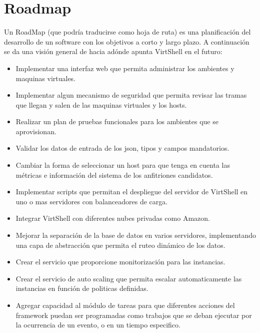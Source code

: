 
\chapter{Roadmap}
\label{roadmap}

Un RoadMap (que podría traducirse como hoja de ruta) es una planificación del desarrollo de un software con los objetivos a corto y largo plazo. A continuación se da una visión general de hacia adónde apunta VirtShell en el futuro:

\begin{itemize}
\item Implementar una interfaz web que permita administrar los ambientes y maquinas virtuales.
\item Implementar algun mecanismo de seguridad que permita revisar las tramas que llegan y salen de las maquinas virtuales y los hosts.
\item Realizar un plan de pruebas funcionales para los ambientes que se aprovisionan.
\item Validar los datos de entrada de los json, tipos y campos mandatorios.
\item Cambiar la forma de seleccionar un host para que tenga en cuenta las métricas e información del sistema de los anfitriones candidatos.
\item Implementar scripts que permitan el despliegue del servidor de VirtShell en uno o mas servidores con balanceadores de carga.
\item Integrar VirtShell con diferentes nubes privadas como Amazon.
\item Mejorar la separación de la base de datos en varios servidores, implementando una capa de abstracción que permita el ruteo dinámico de los datos.
\item Crear el servicio que proporcione monitorización para las instancias.
\item Crear el servicio de auto scaling que permita escalar automaticamente las instancias en función de politicas definidas.
\item Agregar capacidad al módulo de tareas para que diferentes acciones del framework puedan ser programadas como trabajos que se deban ejecutar por la ocurrencia de un evento, o en un tiempo especifico. 
\end{itemize}
        